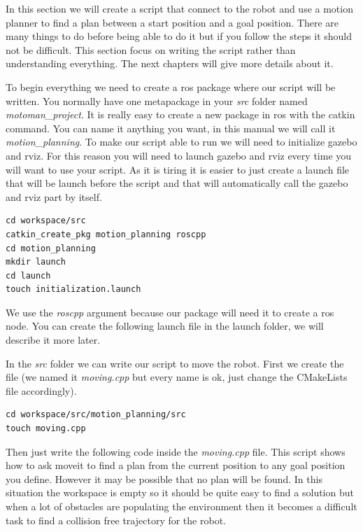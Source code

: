 In this section we will create a script that connect to the robot and use a motion planner to find a plan between a start position and a goal position. There are many things to do before being able to do it but if you follow the steps it should not be difficult. This section focus on writing the script rather than understanding everything. The next chapters will give more details about it.

To begin everything we need to create a ros package where our script will be written. You normally have one metapackage in your \emph{src} folder named \emph{motoman\_project}. It is really easy to create a new package in ros with the catkin command. You can name it anything you want, in this manual we will call it \emph{motion\_planning}. To make our script able to run we will need to initialize gazebo and rviz. For this reason you will need to launch gazebo and rviz every time you will want to use your script. As it is tiring it is easier to just create a launch file that will be launch before the script and that will automatically call the gazebo and rviz part by itself.


\begin{lstlisting}
cd workspace/src
catkin_create_pkg motion_planning roscpp
cd motion_planning
mkdir launch
cd launch
touch initialization.launch
\end{lstlisting}

We use the \emph{roscpp} argument because our package will need it to create a ros node. You can create the following launch file in the launch folder, we will describe it more later. 




In the \emph{src} folder we can write our script to move the robot. First we create the file (we named it \emph{moving.cpp} but every name is ok, just change the CMakeLists file accordingly). 

\begin{lstlisting}
cd workspace/src/motion_planning/src
touch moving.cpp
\end{lstlisting}

Then just write the following code inside the \emph{moving.cpp} file. This script shows how to ask moveit to find a plan from the current position to any goal position you define. However it may be possible that no plan will be found. In this situation the workspace is empty so it should be quite easy to find a solution but when a lot of obstacles are populating the environment then it becomes a difficult task to find a collision free trajectory for the robot.

